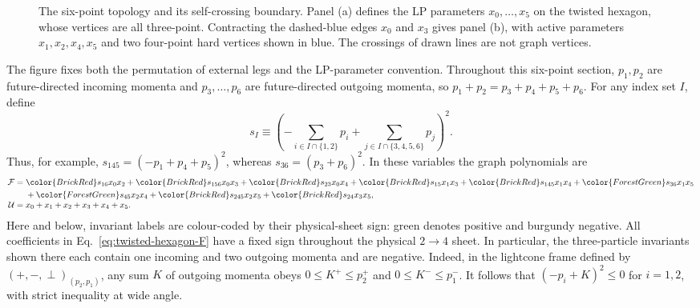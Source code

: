 \documentclass[a4paper,11pt]{article}
\newcommand{\PosInv}[1]{{\color{ForestGreen}#1}}
\newcommand{\NegInv}[1]{{\color{BrickRed}#1}}
\begin{document}
\begin{figure}[htbp]
\caption{The six-point topology and its self-crossing boundary.  Panel (a)
defines the LP parameters \(x_0,\ldots,x_5\) on the twisted hexagon, whose
vertices are all three-point.  Contracting the dashed-blue edges \(x_0\) and
\(x_3\) gives panel (b), with active parameters
\(x_1,x_2,x_4,x_5\) and two four-point hard vertices shown in blue.  The
crossings of drawn lines are not graph vertices.}
\label{fig:twisted-hexagon-topologies}
\end{figure}

The figure fixes both the permutation of external legs and the LP-parameter
convention.  Throughout this six-point section, \(p_1,p_2\) are
future-directed incoming momenta and \(p_3,\ldots,p_6\) are future-directed
outgoing momenta, so
\(p_1+p_2=p_3+p_4+p_5+p_6\).  For any index set \(I\), define
\begin{equation}
 s_I\equiv
 \left(
 -\sum_{i\in I\cap\{1,2\}}p_i
 +\sum_{j\in I\cap\{3,4,5,6\}}p_j
 \right)^2 .
 \label{eq:six-point-mandelstam-convention}
\end{equation}
Thus, for example,
\(s_{145}=(-p_1+p_4+p_5)^2\), whereas
\(s_{36}=(p_3+p_6)^2\).  In these variables the graph polynomials are
\begin{align}
 \mathcal F={}&
 \NegInv{s_{16}}x_0x_2+\NegInv{s_{156}}x_0x_3
 +\NegInv{s_{23}}x_0x_4
 +\NegInv{s_{15}}x_1x_3+\NegInv{s_{145}}x_1x_4
 +\PosInv{s_{36}}x_1x_5\nonumber\\
 &+\PosInv{s_{45}}x_2x_4+\NegInv{s_{245}}x_2x_5
 +\NegInv{s_{24}}x_3x_5,
 \label{eq:twisted-hexagon-F}\\[-1mm]
 \mathcal U={}&x_0+x_1+x_2+x_3+x_4+x_5.
 \label{eq:twisted-hexagon-U}
\end{align}
Here and below, invariant labels are colour-coded by their physical-sheet
sign: \PosInv{green} denotes positive and \NegInv{burgundy} negative.  All
coefficients in Eq.~\eqref{eq:twisted-hexagon-F} have a fixed sign throughout
the physical \(2\to4\) sheet.  In particular, the three-particle invariants
shown there each contain one incoming and two outgoing momenta and are
negative.  Indeed, in the lightcone frame defined by
\((+,-,\perp)_{(p_2,p_1)}\), any sum \(K\) of outgoing momenta obeys
\(0\leq K^+\leq p_2^+\) and \(0\leq K^-\leq p_1^-\).  It follows that
\((-p_i+K)^2\leq0\) for \(i=1,2\), with strict inequality at wide angle.
\end{document}
